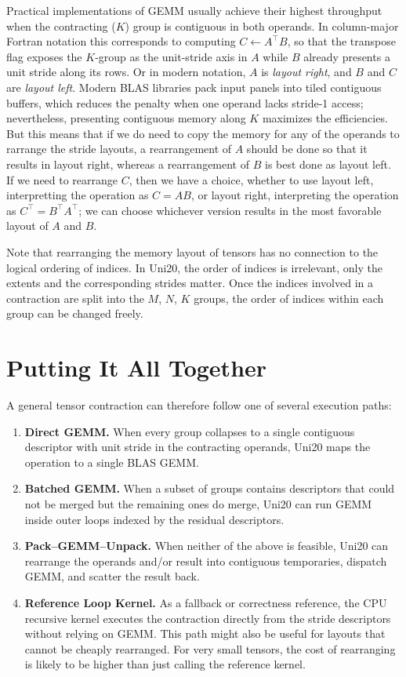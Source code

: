 \documentclass[11pt]{article}
\begin{document}
Practical implementations of GEMM usually
achieve their highest throughput when the contracting ($K$) group is contiguous in both operands.
In column-major Fortran notation this corresponds to computing $C \leftarrow A^\top B$, so that the
transpose flag exposes the $K$-group as the unit-stride axis in $A$ while $B$ already presents a unit
stride along its rows. Or in modern notation, $A$ is \emph{layout right}, and $B$ and $C$ are
\emph{layout left}. Modern BLAS libraries pack input panels into tiled contiguous buffers, which
reduces the penalty when one operand lacks stride-1 access; nevertheless, presenting contiguous
memory along $K$ maximizes the efficiencies. But this means that if we do need to copy the memory
for any of the operands to rarrange the stride layouts, a rearrangement of $A$ should be done
so that it results in layout right, whereas a rearrangement of $B$ is best done as layout left.
If we need to rearrange $C$, then we have a choice, whether to use layout left, interpretting the
operation as $C = AB$, or layout right, interpreting the operation as $C^\top = B^\top A^\top$; we
can choose whichever version results in the most favorable layout of $A$ and $B$.

Note that rearranging the memory layout of tensors has no connection to the logical ordering of indices.
In Uni20, the order of indices is irrelevant, only the extents and the corresponding strides matter.
Once the indices involved in a contraction are split into the $M$, $N$, $K$ groups, the order of
indices within each group can be changed freely.

\section{Putting It All Together}
A general tensor contraction can therefore follow one of several execution paths:
\begin{enumerate}
  \item \textbf{Direct GEMM.}  When every group collapses to a single contiguous descriptor with
        unit stride in the contracting operands, Uni20 maps the operation to a single BLAS GEMM.
  \item \textbf{Batched GEMM.}  When a subset of groups contains descriptors that could not be merged
        but the remaining ones do merge, Uni20 can run GEMM inside outer loops indexed by the residual
        descriptors.
  \item \textbf{Pack--GEMM--Unpack.}  When neither of the above is feasible, Uni20 can rearrange the
        operands and/or result into contiguous temporaries, dispatch GEMM, and scatter the result
        back.
  \item \textbf{Reference Loop Kernel.}  As a fallback or correctness reference, the CPU recursive
        kernel executes the contraction directly from the stride descriptors without relying on
        GEMM.  This path might also be useful for layouts that cannot be cheaply rearranged. For very small tensors,
        the cost of rearranging is likely to be higher than just calling the reference kernel.
\end{enumerate}
\end{document}
